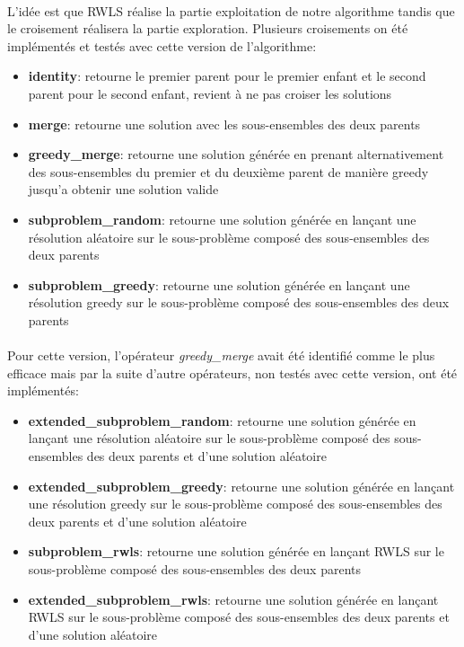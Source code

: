\documentclass[a4paper,11pt,twoside,french,report]{../common/simplem}
\begin{document}
				\paragraph*{}
					L'idée est que \gls{RWLS} réalise la partie exploitation de notre algorithme tandis que le croisement réalisera la partie exploration. Plusieurs croisements on été implémentés et testés avec cette version de l'algorithme:
					\begin{itemize}
						\item \textbf{identity}: retourne le premier parent pour le premier enfant et le second parent pour le second enfant, revient à ne pas croiser les solutions
						\item \textbf{merge}: retourne une solution avec les sous-ensembles des deux parents
						\item \textbf{greedy\_merge}: retourne une solution générée en prenant alternativement des sous-ensembles du premier et du deuxième parent de manière greedy jusqu'a obtenir une solution valide
						\item \textbf{subproblem\_random}: retourne une solution générée en lançant une résolution aléatoire sur le sous-problème composé des sous-ensembles des deux parents
						\item \textbf{subproblem\_greedy}: retourne une solution générée en lançant une résolution greedy sur le sous-problème composé des sous-ensembles des deux parents
					\end{itemize}
				\paragraph*{}
					Pour cette version, l'opérateur \textit{greedy\_merge} avait été identifié comme le plus efficace mais par la suite d'autre opérateurs, non testés avec cette version, ont été implémentés:
					\begin{itemize}
						\item \textbf{extended\_subproblem\_random}: retourne une solution générée en lançant une résolution aléatoire sur le sous-problème composé des sous-ensembles des deux parents et d'une solution aléatoire
						\item \textbf{extended\_subproblem\_greedy}: retourne une solution générée en lançant une résolution greedy sur le sous-problème composé des sous-ensembles des deux parents et d'une solution aléatoire
						\item \textbf{subproblem\_rwls}: retourne une solution générée en lançant \gls{RWLS} sur le sous-problème composé des sous-ensembles des deux parents
						\item \textbf{extended\_subproblem\_rwls}: retourne une solution générée en lançant RWLS sur le sous-problème composé des sous-ensembles des deux parents et d'une solution aléatoire
					\end{itemize}
\end{document}
